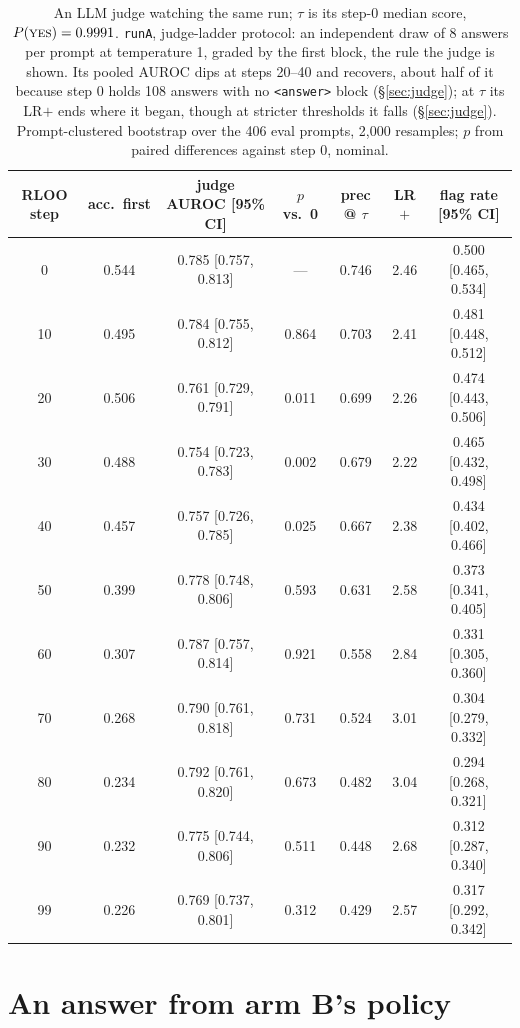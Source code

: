 \documentclass{article}
\begin{document}
\begin{table}[t]
\centering
\footnotesize
\setlength{\tabcolsep}{4pt}
\renewcommand{\arraystretch}{0.92}
\begin{tabular}{ccccccc}
\toprule
RLOO step & acc.\ first & \textbf{judge AUROC} [95\% CI] & $p$ vs.\ 0 & prec @ $\tau$ & \textbf{LR}$+$ & \textbf{flag rate} [95\% CI] \\
\midrule
0  & 0.544 & 0.785 [0.757, 0.813] & --- & 0.746 & 2.46 & 0.500 [0.465, 0.534] \\
10 & 0.495 & 0.784 [0.755, 0.812] & 0.864 & 0.703 & 2.41 & 0.481 [0.448, 0.512] \\
20 & 0.506 & 0.761 [0.729, 0.791] & 0.011 & 0.699 & 2.26 & 0.474 [0.443, 0.506] \\
30 & 0.488 & 0.754 [0.723, 0.783] & 0.002 & 0.679 & 2.22 & 0.465 [0.432, 0.498] \\
40 & 0.457 & 0.757 [0.726, 0.785] & 0.025 & 0.667 & 2.38 & 0.434 [0.402, 0.466] \\
50 & 0.399 & 0.778 [0.748, 0.806] & 0.593 & 0.631 & 2.58 & 0.373 [0.341, 0.405] \\
60 & 0.307 & 0.787 [0.757, 0.814] & 0.921 & 0.558 & 2.84 & 0.331 [0.305, 0.360] \\
70 & 0.268 & 0.790 [0.761, 0.818] & 0.731 & 0.524 & 3.01 & 0.304 [0.279, 0.332] \\
80 & 0.234 & 0.792 [0.761, 0.820] & 0.673 & 0.482 & 3.04 & 0.294 [0.268, 0.321] \\
90 & 0.232 & 0.775 [0.744, 0.806] & 0.511 & 0.448 & 2.68 & 0.312 [0.287, 0.340] \\
99 & 0.226 & 0.769 [0.737, 0.801] & 0.312 & 0.429 & 2.57 & 0.317 [0.292, 0.342] \\
\bottomrule
\end{tabular}
\caption{An LLM judge watching the same run; $\tau$ is its step-0 median score, $P(\textsc{yes}) = 0.9991$. \texttt{runA}, judge-ladder protocol: an independent draw of 8 answers per prompt at temperature 1, graded by the first block, the rule the judge is shown. Its pooled AUROC dips at steps 20--40 and recovers, about half of it because step 0 holds 108 answers with no \texttt{<answer>} block (\S\ref{sec:judge}); at $\tau$ its LR$+$ ends where it began, though at stricter thresholds it falls (\S\ref{sec:judge}). Prompt-clustered bootstrap over the 406 eval prompts, 2{,}000 resamples; $p$ from paired differences against step 0, nominal.}
\label{tab:judge}
\end{table}

\clearpage
\section{An answer from arm B's policy}\label{app:armb}
\end{document}
